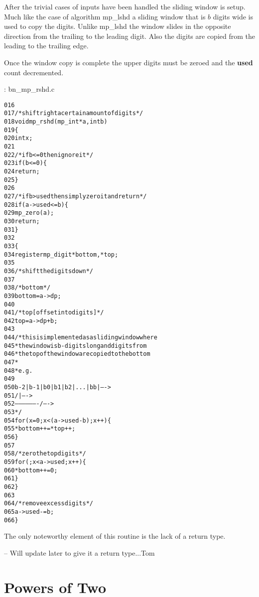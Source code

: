 \documentclass[b5paper]{book}
\begin{document}
After the trivial cases of inputs have been handled the sliding window is setup.  Much like the case of algorithm mp\_lshd a sliding window that
is $b$ digits wide is used to copy the digits.  Unlike mp\_lshd the window slides in the opposite direction from the trailing to the leading digit.  
Also the digits are copied from the leading to the trailing edge.

Once the window copy is complete the upper digits must be zeroed and the \textbf{used} count decremented.

\vspace{+3mm}\begin{small}
\hspace{-5.1mm}{\bf File}: bn\_mp\_rshd.c
\vspace{-3mm}
\begin{alltt}
016   
017   /* shift right a certain amount of digits */
018   void mp_rshd (mp_int * a, int b)
019   \{
020     int     x;
021   
022     /* if b <= 0 then ignore it */
023     if (b <= 0) \{
024       return;
025     \}
026   
027     /* if b > used then simply zero it and return */
028     if (a->used <= b) \{
029       mp_zero (a);
030       return;
031     \}
032   
033     \{
034       register mp_digit *bottom, *top;
035   
036       /* shift the digits down */
037   
038       /* bottom */
039       bottom = a->dp;
040   
041       /* top [offset into digits] */
042       top = a->dp + b;
043   
044       /* this is implemented as a sliding window where 
045        * the window is b-digits long and digits from 
046        * the top of the window are copied to the bottom
047        *
048        * e.g.
049   
050        b-2 | b-1 | b0 | b1 | b2 | ... | bb |   ---->
051                    /                   |      ---->
052                     -------------------/      ---->
053        */
054       for (x = 0; x < (a->used - b); x++) \{
055         *bottom++ = *top++;
056       \}
057   
058       /* zero the top digits */
059       for (; x < a->used; x++) \{
060         *bottom++ = 0;
061       \}
062     \}
063     
064     /* remove excess digits */
065     a->used -= b;
066   \}
\end{alltt}
\end{small}

The only noteworthy element of this routine is the lack of a return type.  

-- Will update later to give it a return type...Tom

\section{Powers of Two}
\end{document}
